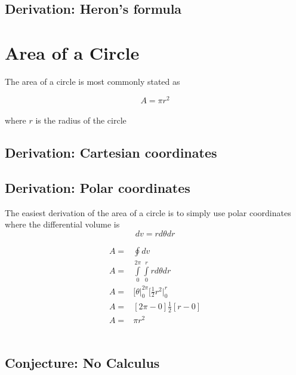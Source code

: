 \subsection{Derivation: Heron's formula}

\section{Area of a Circle}

The area of a circle is most commonly stated as

\[A = \pi r^2\]
\\
where \(r\) is the radius of the circle

\subsection{Derivation: Cartesian coordinates}

\subsection{Derivation: Polar coordinates}
The easiest derivation of the area of a circle is to simply use polar coordinates where the differential volume is 
\[dv = rd\theta dr\]

\begin{align*}
A =& \oint dv \\
A =& \int\limits_{0}^{2\pi}\int\limits_{0}^{r} rd\theta dr \\
A =& \bigg[ \theta \bigg|_{0}^{2\pi}\bigg[ \frac{1}{2}r^2 \bigg|_{0}^{r} \\
A =& [2\pi - 0]\frac{1}{2}[r-0] \\
A =& \pi r^2
\end{align*}
\\
\subsection{Conjecture: No Calculus}

